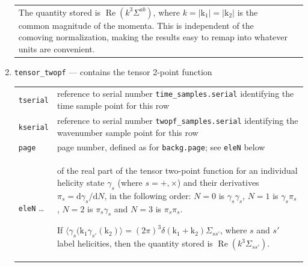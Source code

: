 \documentclass[11pt,a4paper]{article}
\renewcommand{\d}{\mathrm{d}}
\newcommand{\vect}[1]{\bm{\mathrm{{#1}}}}
\newcommand{\semibold}[1]{{\fontseries{b}\selectfont{#1}}}
\newenvironment{sqltablelist}{\renewcommand{\arraystretch}{1.3}\small}{}
\DeclareMathOperator{\realpart}{Re}
\renewcommand{\Re}{\realpart}
\begin{document}
\begin{sqltablelist}
\begin{enumerate}
\begin{tabular}{p{2.5cm}p{11.2cm}}
        The quantity stored is $\Re(k^3 \Sigma^{ab})$, where $k = |\vect{k}_1| = |\vect{k}_2|$
        is the common magnitude of the momenta.
        This is independent of the comoving normalization, making the results
        easy to remap into whatever units are convenient.
    \end{tabular}
    
    \item \texttt{tensor_twopf} --- contains the tensor 2-point function \\
    \label{sqltable:tensor-twopf}
    \begin{tabular}{p{2.5cm}p{11.2cm}}
        \texttt{tserial} & reference to serial number
        \texttt{time_samples.serial} identifying the time sample point for this row \\
        \texttt{kserial} & reference to serial number
        \texttt{twopf_samples.serial} identifying the wavenumber sample point for this row \\
        \texttt{page} & page number, defined as for \texttt{backg.page}; see
        \texttt{eleN} below \\
        \texttt{eleN} \ldots & \semibold{dimensionless components}
        of the real part of the tensor two-point function
        for an individual helicity state $\gamma_s$ (where $s = +, \times$)
        and their derivatives $\pi_s = \d \gamma_s / \d N$,
        in the following order:
        $N = 0$ is $\gamma_s \gamma_s$,
        $N = 1$ is $\gamma_s \pi_s$,
        $N = 2$ is $\pi_s \gamma_s$
        and $N = 3$ is $\pi_s \pi_s$.

        If $\langle \gamma_s(\vect{k}_1 \gamma_{s'}(\vect{k}_2) \rangle =
        (2\pi)^3 \delta(\vect{k}_1 + \vect{k}_2) \Sigma_{ss'}$,
        where $s$ and $s'$ label helicities,
        then the quantity stored is
        $\Re(k^3 \Sigma_{ss'})$.
    \end{tabular}


\end{enumerate}
\end{sqltablelist}
\end{document}
